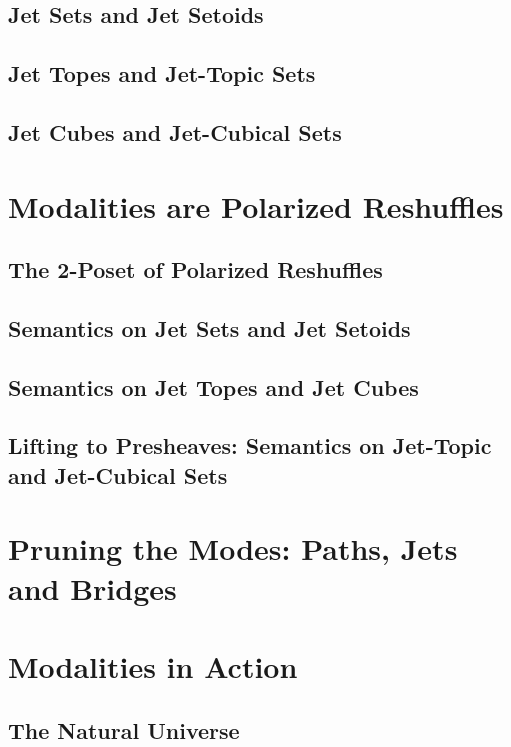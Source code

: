 \documentclass{lmcs} %
\theoremstyle{plain}\newtheorem{satz}[thm]{Satz} %
\theoremstyle{plain}
\theoremstyle{definition}
\begin{document}
\subsection{Jet Sets and Jet Setoids}

\subsection{Jet Topes and Jet-Topic Sets}

\subsection{Jet Cubes and Jet-Cubical Sets}

\section{Modalities are Polarized Reshuffles}

\subsection{The 2-Poset of Polarized Reshuffles}

\subsection{Semantics on Jet Sets and Jet Setoids}

\subsection{Semantics on Jet Topes and Jet Cubes}

\subsection{Lifting to Presheaves: Semantics on Jet-Topic and Jet-Cubical Sets}

\section{Pruning the Modes: Paths, Jets and Bridges}

\section{Modalities in Action}

\subsection{The Natural Universe}
\end{document}
